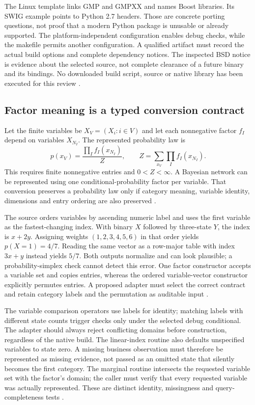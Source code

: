 The Linux template links GMP and GMPXX and names Boost libraries. Its SWIG
example points to Python 2.7 headers. Those are concrete porting questions,
not proof that a modern Python package is unusable or already supported.
The platform-independent configuration enables debug checks, while the
makefile permits another configuration. A qualified artifact must record
the actual build options and complete dependency notices. The inspected BSD
notice is evidence about the selected source, not complete clearance of a
future binary and its bindings. No downloaded build script, source or native
library has been executed for this review \cite{exec24_libdai_source}.

\subsection{Factor meaning is a typed conversion contract}
Let the finite variables be $X_V=(X_i:i\in V)$ and let each nonnegative factor
$f_I$ depend on variables $X_{N_I}$. The represented probability law is
\[
 p(x_V)=\frac{\prod_I f_I(x_{N_I})}{Z},\qquad
 Z=\sum_{x_V}\prod_I f_I(x_{N_I}).
\]
This requires finite nonnegative entries and $0<Z<\infty$. A Bayesian network
can be represented using one conditional-probability factor per variable.
That conversion preserves a probability law only if category meaning,
variable identity, dimensions and entry ordering are also preserved
\cite{exec24_libdai_paper,exec24_libdai_source}.

The source orders variables by ascending numeric label and uses the first
variable as the fastest-changing index. With binary $X$ followed by
three-state $Y$, the index is $x+2y$. Assigning weights $(1,2,3,4,5,6)$ in
that order yields $p(X=1)=4/7$. Reading the same vector as a row-major table
with index $3x+y$ instead yields $5/7$. Both outputs normalize and can look
plausible; a probability-simplex check cannot detect this error. One factor
constructor accepts a variable set and copies entries, whereas the ordered
variable-vector constructor explicitly permutes entries. A proposed adapter
must select the correct contract and retain category labels and the
permutation as auditable input \cite{exec24_libdai_source,exec24_libdai_choice}.

The variable comparison operators use labels for identity; matching labels
with different state counts trigger checks only under the selected debug
conditional. The adapter should always reject conflicting domains before
construction, regardless of the native build. The linear-index routine also
defaults unspecified variables to state zero. A missing business observation
must therefore be represented as missing evidence, not passed as an omitted
state that silently becomes the first category. The marginal routine
intersects the requested variable set with the factor's domain; the caller
must verify that every requested variable was actually represented. These
are distinct identity, missingness and query-completeness tests
\cite{exec24_libdai_source}.

